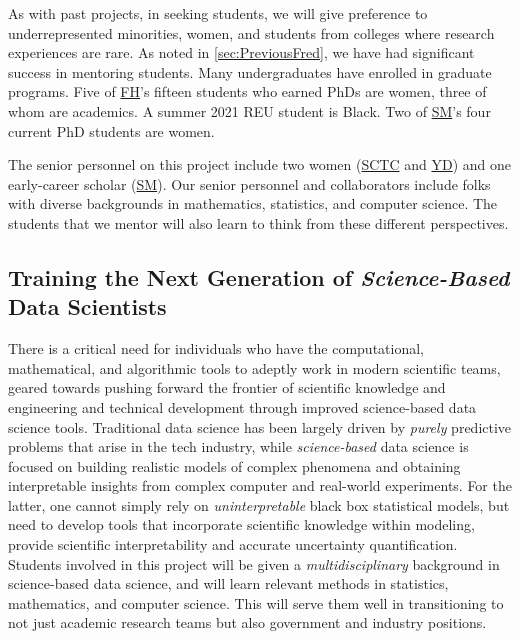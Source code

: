 \documentclass[11pt]{NSFamsart}
\newcommand{\cmtS}[1]{{\color{blue}{(Simon: #1)}}}
\newcommand{\FH}{\hyperlink{FHlink}{FH}\xspace}
\newcommand{\SM}{\hyperlink{SMlink}{SM}\xspace}
\newcommand{\SCTC}{\hyperlink{SCTClink}{SCTC}\xspace}
\newcommand{\YD}{\hyperlink{YDlink}{YD}\xspace}
\begin{document}
\cmtS{may need to buff up a bit on DEI (I think this was a comment in prior reviews): } As with past projects, in seeking students, we will give preference to underrepresented minorities, women, and students from colleges where research experiences are rare.  As noted in \cref{sec:PreviousFred}, we have had significant success in mentoring students.  Many undergraduates have enrolled in graduate programs.  Five of \FH's fifteen students who earned PhDs are women, three of whom are academics. A  summer 2021 REU student is Black.  Two of \SM's four current PhD students are women.  

The senior personnel on this project include two women (\SCTC and \YD) and one early-career scholar (\SM).  Our senior personnel and collaborators include folks with diverse backgrounds in mathematics, statistics, and computer science.  The students  that we mentor will also learn to think from these different perspectives.

\cmtS{Further emphasis on multi-disciplinary education for the sciences? Some sample writing below}


\subsection*{Training the Next Generation of {\em Science-Based} Data Scientists}

There is a critical need for individuals who have the computational, mathematical, and algorithmic tools to adeptly work in modern scientific teams, geared towards pushing forward the frontier of scientific knowledge and engineering and technical development through improved science-based data science tools.  Traditional data science has been largely driven by \textit{purely} predictive problems that arise in the tech industry, while \textit{science-based} data science is focused on building realistic models of complex phenomena and obtaining interpretable insights from complex computer and real-world experiments. For the latter, one cannot simply rely on \textit{uninterpretable} black box statistical models, but need to develop tools that incorporate scientific knowledge within modeling, provide scientific interpretability and accurate uncertainty quantification.  Students involved in this project will be given a \textit{multidisciplinary} background in science-based data science, and will learn relevant methods in statistics, mathematics, and computer science.  This will serve them well in transitioning to not just academic research teams but also government and industry positions.
\end{document}
